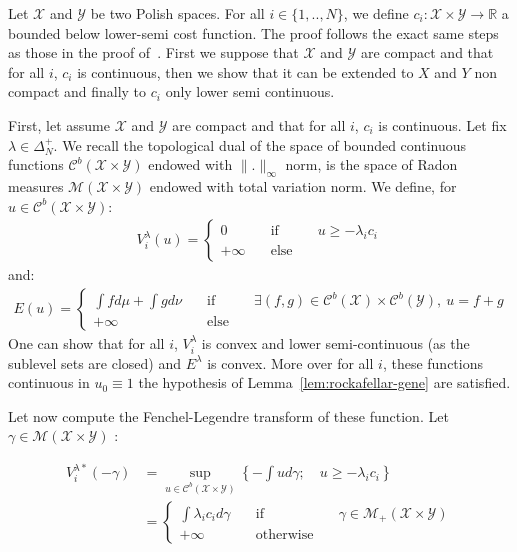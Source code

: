 \begin{prv*}
Let $\mathcal{X}$ and $\mathcal{Y}$ be two Polish spaces. For all $i\in \{1,..,N\}$, we define $c_i:\mathcal{X}\times\mathcal{Y}\rightarrow \mathbb{R}$ a bounded below lower-semi cost function. The proof follows the exact same steps as those in the proof of~\citep[Theorem 1.3]{villani2003topics}. First we suppose that $\mathcal{X}$ and $\mathcal{Y}$ are compact and that for all $i$, $c_i$ is continuous, then we show that it can be extended to $X$ and $Y$ non compact and finally to $c_i$ only lower semi continuous.

\medskip
First, let assume $\mathcal{X}$ and $\mathcal{Y}$ are compact and that for all $i$, $c_i$ is continuous. Let fix $\lambda \in\Delta^+_N$. We recall the topological dual of the space of bounded continuous functions $\mathcal{C}^b(\mathcal{X}\times\mathcal{Y})$ endowed with $\lVert.\rVert_\infty$ norm, is the space of Radon measures $\mathcal{M}(\mathcal{X}\times\mathcal{Y})$ endowed with total variation norm. We define, for $u\in \mathcal{C}^b(\mathcal{X}\times\mathcal{Y})$:
\begin{align*}
V^\lambda_i(u) =
\left\{\begin{matrix} 0 &\quad\text{if}\quad& u\geq -\lambda_i c_i\\
+\infty &\quad\text{else}\quad&\end{matrix}\right.
\end{align*}
and:
\begin{align*}
E(u)=\left\{\begin{matrix} \int fd\mu+\int gd\nu &\quad\text{if}\quad& \exists (f,g)\in \mathcal{C}^b(\mathcal{X})\times \mathcal{C}^b(\mathcal{Y}),~ u = f+g\\
+\infty &\quad\text{else}\quad&\end{matrix}\right.
\end{align*}
One can show that for all $i$, $V^\lambda_i$ is convex and lower semi-continuous (as the sublevel sets are closed) and $E^\lambda$ is convex. More over for all $i$, these functions continuous in $u_0\equiv 1$ the hypothesis of Lemma~\ref{lem:rockafellar-gene} are satisfied.


Let now compute the Fenchel-Legendre transform of these function.  Let $\gamma\in \mathcal{M}(\mathcal{X}\times\mathcal{Y})$ :

\begin{align*}
V^{\lambda*}_i(-\gamma) &= \sup_{u\in \mathcal{C}^b(\mathcal{X}\times\mathcal{Y})}\left\{-\int ud\gamma;\quad u\geq-\lambda_i c_i\right\}
\\
& = \left\{\begin{matrix}\int \lambda_i c_i d\gamma &\quad\text{if} \quad& \gamma\in\mathcal{M}_+(\mathcal{X}\times\mathcal{Y}) \\
+\infty &\quad\text{otherwise}\quad& \end{matrix}\right.
\end{align*}


\end{prv*}
